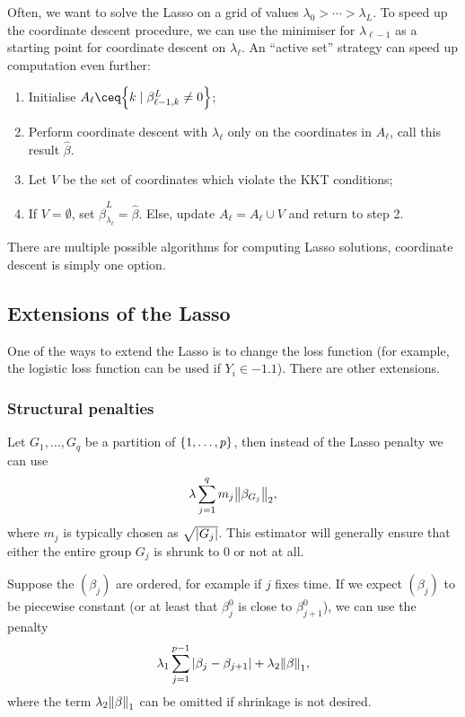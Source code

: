 Often, we want to solve the Lasso on a grid of values $\lambda_0 > \dotsb > \lambda_L$. To speed up the coordinate descent procedure, we can use the minimiser for $\lambda_{\ell -1}$ as a starting point for coordinate descent on $\lambda_\ell$. An ``active set'' strategy can speed up computation even further: 
\begin{enumerate}
	\item Initialise $A_\ell \ceq \qty{k \mid \beta^L_{\ell - 1, k} \neq 0}$;
	\item Perform coordinate descent with $\lambda_\ell$ only on the coordinates in $A_\ell$, call this result $\hat\beta$. 
	\item Let $V$ be the set of coordinates which violate the KKT conditions;
	\item If $V = \emptyset$, set $\hat\beta_{\lambda_\ell}^L = \hat\beta$. Else, update $A_\ell = A_\ell \cup V$ and return to step 2. 
\end{enumerate}

\begin{remark}
	There are multiple possible algorithms for computing Lasso solutions, coordinate descent is simply one option. 
\end{remark}

\subsection{Extensions of the Lasso}
One of the ways to extend the Lasso is to change the loss function (for example,
the logistic loss function can be used if $Y_i \in \qty{-1, 1}$). 
There are other extensions. 

\subsubsection{Structural penalties}
\begin{example}
	Let $G_1, \dotsc, G_q$ be a partition of $\qty{1, \dotsc, p}$, then instead of the Lasso penalty we can use
	\[
	\lambda \sum_{j=1}^q m_j \norm{\beta_{G_j}}_2,
	\]
	where $m_j$ is typically chosen as $\sqrt{\abs{G_j}}$. This estimator will generally ensure that either the entire group $G_j$ is shrunk to 0 or not at all. 
\end{example}

\begin{example}
	Suppose the $(\beta_j)$ are ordered, for example if $j$ fixes time. If we expect $(\beta_j)$ to be piecewise constant (or at least that $\beta^0_j$ is close to $\beta^0_{j+1}$), we can use the penalty 
	\[
	\lambda_1 \sum_{j=1}^{p-1} \abs{\beta_j - \beta_{j+1}} + \lambda_2 \norm{\beta}_1, 
	\]
	where the term $\lambda_2 \norm{\beta}_1$ can be omitted if shrinkage is not desired. 
\end{example}

